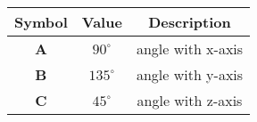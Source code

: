 \begin{tabular}[12pt]{ |c|c|c|}
    \hline
    \textbf{Symbol} & \textbf{Value} & \textbf{Description} \\
    \hline
    \textbf{A} & $90^\circ$ & angle with x-axis\\
    \hline 
    \textbf{B} & $135^\circ$ & angle with y-axis\\
    \hline
    \textbf{C} & $45^\circ$ & angle with z-axis\\
    \hline
    \end{tabular}
